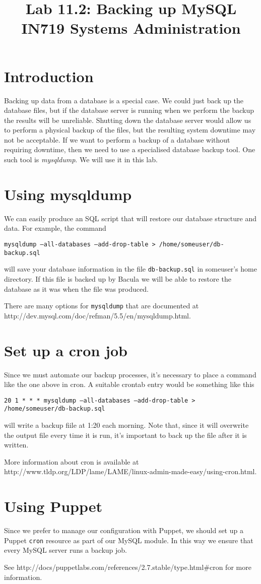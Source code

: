 \documentclass{article}   	%
\title{Lab 11.2:  Backing up MySQL\\ IN719 Systems Administration}
\date{}							%
\begin{document}
\maketitle

\section*{Introduction}
Backing up data from a database is a special case.  We could just back up the database files, but if the database server is running when we perform the backup the results will be unreliable. Shutting down the database server would allow us to perform a physical backup of the files, but the resulting system downtime may not be acceptable.  If we want to perform a backup of a database without requiring downtime, then we need to use a specialised database backup tool.  One such tool is \emph{mysqldump}.  We will use it in this lab.

\section{Using mysqldump}
We can easily produce an SQL script that will restore our database structure and data.  For example, the command

\texttt {mysqldump --all-databases --add-drop-table > /home/someuser/db-backup.sql}

will save your database information in the file \texttt{db-backup.sql} in someuser's home directory.  If this file is backed up by Bacula we will be able to restore the database as it was when the file was produced.

There are many options for \texttt{mysqldump} that are documented at http://dev.mysql.com/doc/refman/5.5/en/mysqldump.html.

\section{Set up a cron job}
Since we must automate our backup processes, it's necessary to place a command like the one above in cron.  A suitable crontab entry would be something like this

\texttt{20 1 * * *    mysqldump --all-databases --add-drop-table > /home/someuser/db-backup.sql}

will write a backup fiile at 1:20 each morning.  Note that, since it will overwrite the output file every time it is run, it's important to back up the file after it is written.

More information about cron is available at http://www.tldp.org/LDP/lame/LAME/linux-admin-made-easy/using-cron.html.

\section{Using Puppet}
Since we prefer to manage our configuration with Puppet, we should set up a Puppet \texttt{cron} resource as part of our MySQL module.  In this way we ensure that every MySQL server runs a backup job.

See http://docs/puppetlabs.com/references/2.7.stable/type.html\#cron for more information.
\end{document}
